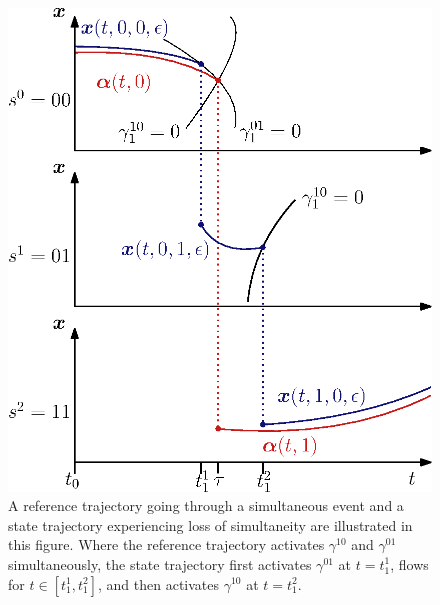\documentclass[../DC2017114Bouma.tex]{subfiles}
\begin{document}
\begin{figure}[h]
\centering
\includegraphics[width=.52\textwidth]{simulpert.eps}\caption{A reference trajectory going through a simultaneous event and a state trajectory experiencing loss of simultaneity are illustrated in this figure. Where the reference trajectory activates $\gamma^{10}$ and $\gamma^{01}$ simultaneously, the state trajectory first activates $\gamma^{01}$ at $t=t^1_1$, flows for $t\in [t^1_1,t^2_1]$, and then activates $\gamma^{10}$ at $t=t^2_1$.}\label{fig:4simulpert}
\end{figure}
\end{document}
